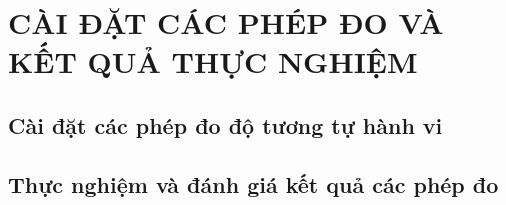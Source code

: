 \chapter{CÀI ĐẶT CÁC PHÉP ĐO VÀ KẾT QUẢ THỰC NGHIỆM}
	\section{Cài đặt các phép đo độ tương tự hành vi}
	\section{Thực nghiệm và đánh giá kết quả các phép đo}